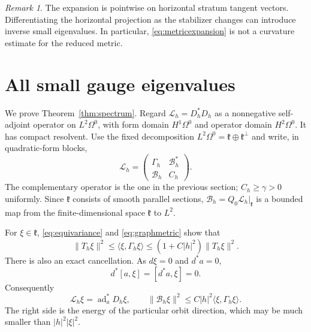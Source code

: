 \documentclass[11pt]{amsart}
\theoremstyle{definition}
\theoremstyle{remark}
\newtheorem{remark}[theorem]{Remark}
\newcommand{\kk}{\mathfrak k}
\newcommand{\ad}{\operatorname{ad}}
\newcommand{\ip}[2]{\langle #1,#2\rangle}
\newcommand{\norm}[1]{\lVert #1\rVert}
\begin{document}
\begin{remark}
The expansion is pointwise on horizontal stratum tangent vectors.
Differentiating the horizontal projection as the stabilizer changes
can introduce inverse small eigenvalues. In particular,
\eqref{eq:metricexpansion} is not a curvature estimate for the
reduced metric.
\end{remark}

\section{All small gauge eigenvalues}\label{sec:spectrum}

We prove Theorem~\ref{thm:spectrum}. Regard
$\mathcal L_h=D_h^*D_h$ as a nonnegative self-adjoint operator on
$L^2\Omega^0$, with form domain $H^1\Omega^0$ and operator domain
$H^2\Omega^0$. It has compact resolvent. Use the fixed decomposition
$L^2\Omega^0=\kk\oplus\kk^\perp$ and write, in quadratic-form
blocks,
\begin{equation}\label{eq:block}
 \mathcal L_h=
 \begin{pmatrix}\Gamma_h&\mathcal B_h^*\\
                 \mathcal B_h&C_h\end{pmatrix}.
\end{equation}
The complementary operator is the one in the previous section;
$C_h\geq\gamma>0$ uniformly. Since $\kk$ consists of smooth
parallel sections, $\mathcal B_h=Q_0\mathcal L_h|_\kk$ is a
bounded map from the finite-dimensional space $\kk$ to $L^2$.

For $\xi\in\kk$, \eqref{eq:equivariance} and
\eqref{eq:graphmetric} show that
\begin{equation}\label{eq:Gamma}
 \norm{T_h\xi}^2
 \leq\ip{\xi}{\Gamma_h\xi}
 \leq(1+C|h|^2)\norm{T_h\xi}^2.
\end{equation}
There is also an exact cancellation. As $d\xi=0$ and $d^*a=0$,
\[
 d^*[a,\xi]=[d^*a,\xi]=0.
\]
Consequently
\begin{equation}\label{eq:spectralcoupling}
 \mathcal L_h\xi=\ad_a^*D_h\xi,
 \qquad
 \norm{\mathcal B_h\xi}^2
 \leq C|h|^2\ip{\xi}{\Gamma_h\xi}.
\end{equation}
The right side is the energy of the particular orbit direction,
which may be much smaller than $|h|^2|\xi|^2$.
\end{document}
